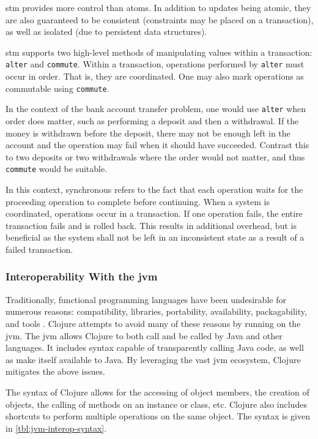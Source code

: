 			\gls{stm} provides more control than atoms.  In addition to updates being atomic, they are also guaranteed to be consistent (constraints may be placed on a transaction), as well as isolated (due to persistent data structures).
			
			\gls{stm} supports two high-level methods of manipulating values within a transaction:  \texttt{alter} and \texttt{commute}.  Within a transaction, operations performed by \texttt{alter} must occur in order.  That is, they are coordinated.  One may also mark operations as commutable using \texttt{commute}.
			
			In the context of the bank account transfer problem, one would use \texttt{alter} when order does matter, such as performing a deposit and then a withdrawal.  If the money is withdrawn before the deposit, there may not be enough left in the account and the operation may fail when it should have succeeded.  Contrast this to two deposits or two withdrawals where the order would not matter, and thus \texttt{commute} would be suitable.
			
			In this context, synchronous refers to the fact that each operation waits for the proceeding operation to complete before continuing.  When a system is coordinated, operations occur in a transaction.  If one operation fails, the entire transaction fails and is rolled back.  This results in additional overhead, but is beneficial as the system shall not be left in an inconsistent state as a result of a failed transaction.
			
		\subsubsection{Interoperability With the \gls{jvm}}
			Traditionally, functional programming languages have been undesirable for numerous reasons:  compatibility, libraries, portability, availability, packagability, and tools \cite{no-fp-98}.  Clojure attempts to avoid many of these reasons by running on the \gls{jvm}.  The \gls{jvm} allows Clojure to both call and be called by Java and other languages.  It includes syntax capable of transparently calling Java code, as well as make itself available to Java.  By leveraging the vast \gls{jvm} ecosystem, Clojure mitigates the above issues.
			
			The syntax of Clojure allows for the accessing of object members, the creation of objects, the calling of methods on an instance or class, etc.  Clojure also includes shortcuts to perform multiple operations on the same object.  The syntax is given in \cref{tbl:jvm-interop-syntax}.
			
